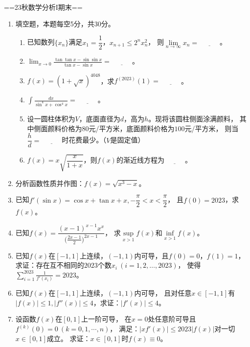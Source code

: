 ==23秋数学分析I期末==
\begin{enumerate}
    \item[一]填空题，本题每空5分，共30分。
    \begin{enumerate}
    \item 已知数列$\{x_n\}$满足$x_1=\dfrac{1}{2}$，$x_{n+1}\le2^nx_n^2$，
    则$\lim\limits_{n\to\infty}x_n=\underline{\qquad\quad}$。
    \item $\displaystyle\lim_{x\to0}\frac{\tan\tan x-\sin\sin x}{\tan x-\sin x}
    =\underline{\qquad\quad}$。
    \item $f(x)=(1+\sqrt{x})^{4048}$，求$f^{(2023)}(1)=\underline{\qquad\quad}$。
    \item $\displaystyle\int\frac{dx}{\sin^4x+\cos^4x}=\underline{\qquad\quad}$。
    \item 设一圆柱体积为$V$，底面直径为$d$，高为$h$。现将该圆柱侧面涂满颜料，
    其中侧面颜料价格为$80$元/平方米，底面颜料价格为$100$元/平方米，
    则当$\dfrac{h}{d}=\underline{\qquad\quad}$时花费最少。（$V$是固定值）
    \item $f(x)=x\sqrt{\dfrac{x}{1+x}}$，则$f(x)$的渐近线方程为$\underline{\qquad\quad}$。
    \end{enumerate}
    \item[二] 分析函数性质并作图：$f(x)=\sqrt{x^3-x}$。
    \item[三] 已知$f'(\sin x)=\cos x+\tan x+x,-\dfrac{\pi}{2}<x<\dfrac{\pi}{2}$，
    且$f(0)=2023$，求$f(x)$。
    \item[四] 已知$f(x)=\dfrac{(x-1)^{x-1}x^x}{\big(\frac{2x-1}{2}\big)^{2x-1}}$，
    求$\sup\limits_{x>1}f(x)$和$\inf\limits_{x>1}f(x)$。
    \item[五] 已知$f(x)$在$[-1,1]$上连续，$(-1,1)$内可导，且$f(0)=0$，$f(1)=1$，
    求证：存在互不相同的$2023$个数$x_i\ (i=1,2,\dots,2023)$，
    使得$\displaystyle\sum_{i=1}^{2023}\frac{1}{f'(x_i)}=2023$。
    \item[六] 已知$f(x)$在$[-1,1]$上连续，$(-1,1)$内可导，
    且对任意$x\in[-1,1]$有$|f(x)|\le1,|f''(x)|\le4$，求证：$|f'(x)|\le4$。
    \item[七] 设函数$f(x)$在$[0,1]$上一阶可导，
    在$x=0$处任意阶可导且$f^{(k)}(0)=0\ (k=0,1,\cdots,n)$，
    满足：$|xf'(x)|\le2023|f(x)|$对一切$x\in[0,1]$成立。
    求证：$x\in[0,1]$时$f(x)\equiv0$。
\end{enumerate}

